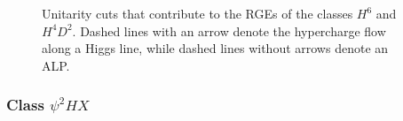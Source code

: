 \begin{figure}[h!tb]
\caption[Unitarity cuts for the renormalization of the classes $H^6$ and $H^4D^2$]{Unitarity cuts that contribute to the RGEs of the classes $H^6$ and $H^4 D^2$. Dashed
lines with an arrow denote the hypercharge flow along a Higgs line, while dashed lines without
arrows denote an ALP.}
\label{fig:ALPclassH6}
\end{figure}

\subsubsection{\texorpdfstring{Class $\psi^2 H X$}{Class psi2 H X}}

